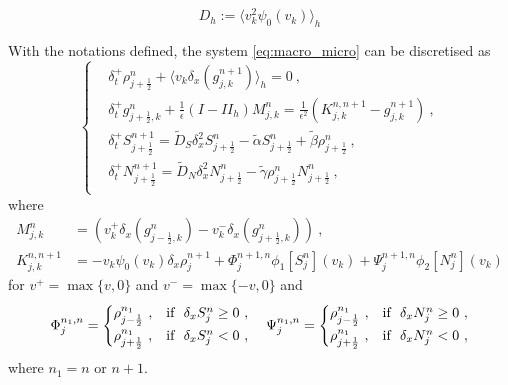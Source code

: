 \documentclass[11pt,twoside]{article}
\numberwithin{equation}{section}
\begin{document}
$$D_h:=\langle v_k^2\psi_0(v_k)\rangle_h$$

 
  With the notations defined, the system \ref{eq:macro_micro} can be discretised as
   \begin{equation}
\begin{cases}\label{eq: main scheme}
   &\delta_t^+\rho_{j+\frac{1}{2}}^n +\langle v_k \delta_x (g_{j,k}^{n+1})\rangle_h=0\ ,\\
   
        &\delta_t^+ g_{j+\frac{1}{2},k}^n + \frac{1}{\epsilon}(I-II_h)M_{j,k}^n =\frac{1}{\epsilon^2}(K_{j,k}^{n,n+1}-g_{j,k}^{n+1})\ ,\\
        
        &\delta_t^+S_{j+\frac{1}{2}}^{n+1} = \tilde{D}_S \delta _x^2S_{j+\frac{1}{2}}^{n}-\tilde{\alpha} S_{j+\frac{1}{2}}^{n}+\tilde{\beta}\rho_{j+\frac{1}{2}}^{n}\ ,\\
        
     &\delta_t^+N_{j+\frac{1}{2}}^{n+1} = \tilde{D}_N \delta _x^2N_{j+\frac{1}{2}}^{n}-\tilde{\gamma} \rho_{j+\frac{1}{2}}^{n}N_{j+\frac{1}{2}}^{n}\ ,\\
   \end{cases}
   \end{equation}
where
\begin{align}
M_{j,k}^n&=(v_k^+\delta_x(g_{j-\frac{1}{2},k}^n)-v_k^-\delta_x(g_{j+\frac{1}{2},k}^n))\ ,\\
K_{j,k}^{n,n+1}
& = -v_k\psi_0(v_k)\delta_x\rho_{j}^{n+1}+{\Phi^{n+1,n}_{j}\phi_1[S_{j}^n](v_k)+\Psi^{n+1,n}_{j}\phi_2[N_{j}^n](v_k)}
\end{align}
for $v^+=\max\{v,0\}$ and $v^-=\max\{-v,0\}$ and 
\[
\Phi^{n_1,n}_{j}=\begin{cases}
     \rho^{n_1}_{j-\frac{1}{2}}\ ,  &\textnormal{if}\ \  \delta_x S_{j}^n\geq 0\ ,\\
    \rho^{n_1}_{j+\frac{1}{2}}\ , &\textnormal{if}\ \ \delta_x S_{j}^n< 0\ ,
\end{cases}
\quad \Psi^{n_1,n}_{j}=\begin{cases}
     \rho^{n_1}_{j-\frac{1}{2}}\ , & \textnormal{if}\ \  \delta_x N_{j}^n\geq 0\ ,\\
    \rho^{n_1}_{j+\frac{1}{2}}\ , & \textnormal{if}\ \ \delta_x N_{j}^n< 0\ ,
    \end{cases}
\]
where $n_1=n$ or $n+1$.
\end{document}
